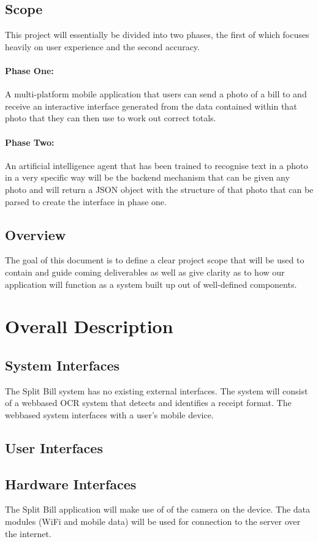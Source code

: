 \documentclass[12pt,a4paper]{article}
\begin{document}
   	\subsection{Scope}
   	This project will essentially be divided into two phases, the first of which focuses heavily on user experience and the second accuracy.
		\paragraph{Phase One:}
		A multi-platform mobile application that users can send a photo of a bill to and receive an interactive interface generated from the data contained within that photo that they can then use to work out correct totals.
		\paragraph{Phase Two:}
		An artificial intelligence agent that has been trained to recognise text in a photo in a very specific way will be the backend mechanism that can be given any photo and will return a JSON object with the structure of that photo that can be parsed to create the interface in phase one.

   	\subsection{Overview}
The goal of this document is to define a clear project scope that will be used to contain and guide coming deliverables as well as give clarity as to how our application will function as a system built up out of well-defined components.

   \section{Overall Description}
   	\subsection{System Interfaces}
		The Split Bill system has no existing external interfaces. The system will consist of a webbased OCR system that detects and identifies a receipt format. The webbased system interfaces with a user's mobile device.
   	\subsection{User Interfaces}
   	\subsection{Hardware Interfaces}
   		The Split Bill application will make use of of the camera on the device. The data modules (WiFi and mobile data) will be used for connection to the server over the internet.
\end{document}
